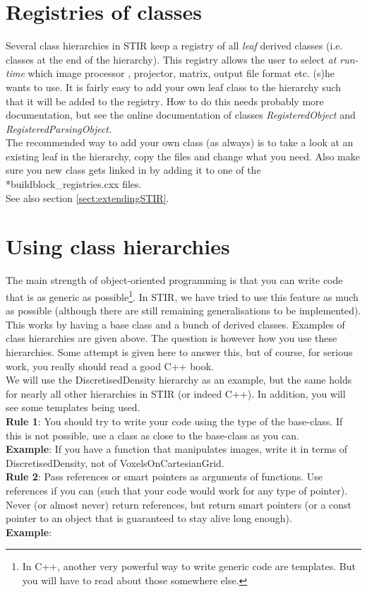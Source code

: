 \documentclass{article}
\begin{document}
\section{
Registries of classes \label{sect:registries}}

Several class hierarchies in STIR keep a registry of all \textit{leaf} 
derived classes (i.e. classes at the end of the hierarchy). This 
registry allows the user to select \textit{at run-time} which image 
processor , projector, matrix, output file format etc. (s)he 
wants to use. It is fairly easy to add your own leaf class to 
the hierarchy such that it will be added to the registry\textit{.} How 
to do this needs probably more documentation, but see the online 
documentation of classes \textit{RegisteredObject} and \textit{RegisteredParsingObject.} 
\\
The recommended way to add your own class (as always) is to take 
a look at an existing leaf in the hierarchy, copy the files and 
change what you need. Also make sure you new class gets linked 
in by adding it to one of the *buildblock\_registries.cxx files. 
\\
See also section \ref{sect:extendingSTIR}.



\section{
Using class hierarchies \label{sect:classhierarchies}}

The main strength of object-oriented programming is that you 
can write code that is as generic as possible\footnote{{In C++, 
another very powerful way to write generic code are templates. 
But you will have to read about those somewhere else.}}. In STIR, 
we have tried to use this feature as much as possible (although 
there are still remaining generalisations to be implemented). 
This works by having a base class and a bunch of derived classes. 
Examples of class hierarchies are given above. The question is 
however how you use these hierarchies. Some attempt is given 
here to answer this, but of course, for serious work, you really 
should read a good C++ book.\\
We will use the DiscretisedDensity hierarchy as an example, but 
the same holds for nearly all other hierarchies in STIR (or indeed 
C++). In addition, you will see some templates being used.\\
\textbf{Rule 1}: You should try to write your code using the type 
of the base-class. If this is not possible, use a class as close 
to the base-class as you can.\\
\textbf{Example}: If you have a function that manipulates images, 
write it in terms of DiscretisedDensity, not of VoxelsOnCartesianGrid.\\
\textbf{Rule 2}: Pass references or smart pointers as arguments of 
functions. Use references if you can (such that your code would 
work for any type of pointer). Never (or almost never) return 
references, but return smart pointers (or a const pointer to 
an object that is guaranteed to stay alive long enough).\\
\textbf{Example}:
\end{document}
